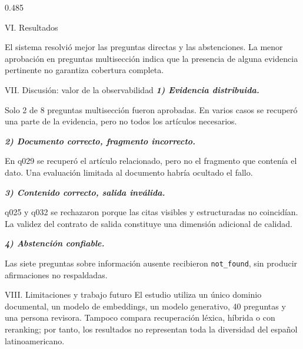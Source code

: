 \documentclass[final]{beamer}
\newcommand{\finding}[3]{%
  \noindent
  {\bfseries\itshape #1) #2.}\enspace
  {\fontsize{27}{31}\selectfont #3\par}
  \vspace{0.40cm}
}
\begin{document}
\begin{frame}[t]
\begin{columns}[T,totalwidth=\textwidth]
\begin{column}{0.485\textwidth}
\begin{block}{VI. Resultados}

\vspace{0.35cm}
\justifying
El sistema resolvió mejor las preguntas directas y las abstenciones. La menor
aprobación en preguntas multisección indica que la presencia de alguna
evidencia pertinente no garantiza cobertura completa.
\end{block}

\begin{block}{VII. Discusión: valor de la observabilidad}
\finding{1}{Evidencia distribuida}{
  Solo 2 de 8 preguntas multisección fueron aprobadas. En varios casos se
  recuperó una parte de la evidencia, pero no todos los artículos necesarios.}

\finding{2}{Documento correcto, fragmento incorrecto}{
  En q029 se recuperó el artículo relacionado, pero no el fragmento que
  contenía el dato. Una evaluación limitada al documento habría ocultado el
  fallo.}

\finding{3}{Contenido correcto, salida inválida}{
  q025 y q032 se rechazaron porque las citas visibles y estructuradas no
  coincidían. La validez del contrato de salida constituye una dimensión
  adicional de calidad.}

\finding{4}{Abstención confiable}{
  Las siete preguntas sobre información ausente recibieron
  \texttt{not\_found}, sin producir afirmaciones no respaldadas.}
\end{block}

\begin{block}{VIII. Limitaciones y trabajo futuro}
El estudio utiliza un único dominio documental, un modelo de embeddings, un
modelo generativo, 40 preguntas y una persona revisora. Tampoco compara
recuperación léxica, híbrida o con reranking; por tanto, los resultados no
representan toda la diversidad del español latinoamericano.


\end{block}
\end{column}
\end{columns}
\end{frame}
\end{document}

